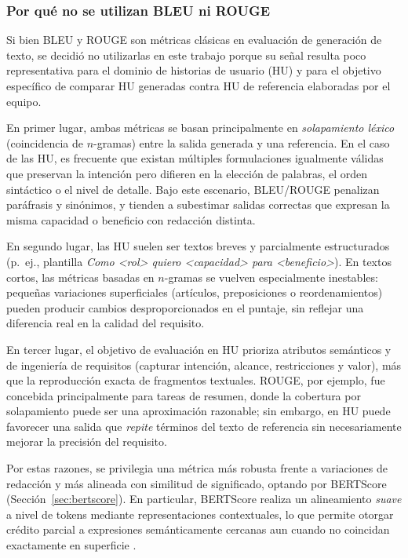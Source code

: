 \subsubsection{Por qué no se utilizan BLEU ni ROUGE}

Si bien BLEU \cite{papineni2002bleu} y ROUGE \cite{lin2004rouge} son métricas clásicas en evaluación de generación de texto, se decidió no utilizarlas en este trabajo porque su señal resulta poco representativa para el dominio de historias de usuario (HU) y para el objetivo específico de comparar HU generadas contra HU de referencia elaboradas por el equipo.

En primer lugar, ambas métricas se basan principalmente en \textit{solapamiento léxico} (coincidencia de $n$-gramas) entre la salida generada y una referencia. En el caso de las HU, es frecuente que existan múltiples formulaciones igualmente válidas que preservan la intención pero difieren en la elección de palabras, el orden sintáctico o el nivel de detalle. Bajo este escenario, BLEU/ROUGE penalizan paráfrasis y sinónimos, y tienden a subestimar salidas correctas que expresan la misma capacidad o beneficio con redacción distinta.

En segundo lugar, las HU suelen ser textos breves y parcialmente estructurados (p.\ ej., plantilla \textit{Como <rol> quiero <capacidad> para <beneficio>}). En textos cortos, las métricas basadas en $n$-gramas se vuelven especialmente inestables: pequeñas variaciones superficiales (artículos, preposiciones o reordenamientos) pueden producir cambios desproporcionados en el puntaje, sin reflejar una diferencia real en la calidad del requisito.

En tercer lugar, el objetivo de evaluación en HU prioriza atributos semánticos y de ingeniería de requisitos (capturar intención, alcance, restricciones y valor), más que la reproducción exacta de fragmentos textuales. ROUGE, por ejemplo, fue concebida principalmente para tareas de resumen, donde la cobertura por solapamiento puede ser una aproximación razonable; sin embargo, en HU puede favorecer una salida que \textit{repite} términos del texto de referencia sin necesariamente mejorar la precisión del requisito.

Por estas razones, se privilegia una métrica más robusta frente a variaciones de redacción y más alineada con similitud de significado, optando por BERTScore (Sección~\ref{sec:bertscore}). En particular, BERTScore realiza un alineamiento \textit{suave} a nivel de tokens mediante representaciones contextuales, lo que permite otorgar crédito parcial a expresiones semánticamente cercanas aun cuando no coincidan exactamente en superficie \cite{zhang2020bertscore}.

